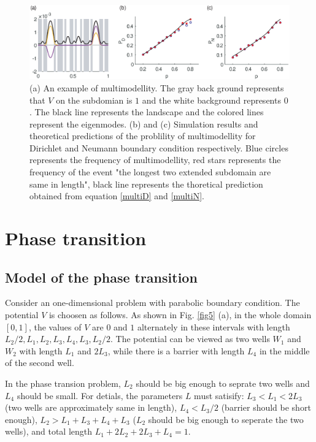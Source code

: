 \documentclass[a4paper,11pt]{article}
\begin{document}
\begin{figure}
\centering
\includegraphics[width=\linewidth]{Fig4.eps}
\caption{(a) An example of multimodellity. The gray back ground represents that $V$ on the subdomian is $1$ and the white background represents $0$. The black line represents the landscape and the colored lines represent the eigenmodes. (b) and (c) Simulation results and theoretical predictions of the problility of multimodellity for Dirichlet and Neumann boundary condition respectively. Blue circles represents the frequency of multimodellity, red stars represents the frequency of the event "the longest two extended subdomain are same in length", black line represents the thoretical prediction obtained from equation \eqref{multiD} and \eqref{multiN}.}
\label{fig4}
\end{figure}

\section{Phase transition}\label{phase}

\subsection{Model of the phase transition}

Consider an one-dimensional problem with parabolic boundary condition. The potential $V$ is choosen as follows. As shown in Fig. \ref{fig5} (a), in the whole domain $[0,1]$, the values of $V$ are $0$ and $1$ alternately in these intervals with length $L_2/2, L_1, L_2, L_3, L_4, L_3, L_2/2$. The potential can be viewed as two wells $W_1$ and $W_2$ with length $L_1$ and $2 L_3$, while there is a barrier with length $L_4$ in the middle of the second well.

In the phase transion problem, $L_2$ should be big enough to seprate two wells and $L_4$ should be small. For detials, the parameters $L$ must satisify: $L_3 < L_1 < 2 L_3$ (two wells are approximately same in length), $L_4 < L_3 / 2$ (barrier should be short enough), $L_2 > L_1+ L_3 + L_4 + L_3$ ($L_2$ should be big enough to seperate the two wells), and total length $L_1 + 2 L_2 + 2L_3 + L_4 = 1$.
\end{document}
